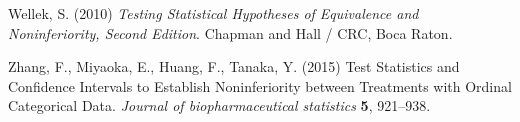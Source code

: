 \documentclass[bimj,fleqn]{w-art}
\theoremstyle{plain}
\theoremstyle{definition}
\begin{document}
\begin{thebibliography}{10}
Wellek, S. (2010) \textit{Testing Statistical Hypotheses of Equivalence and
Noninferiority, Second Edition}.
Chapman and Hall / CRC, Boca Raton.

Zhang, F., Miyaoka, E., Huang, F.,  Tanaka, Y. (2015)  Test Statistics and
Confidence Intervals to Establish Noninferiority between Treatments with Ordinal
Categorical Data. \textit{Journal of biopharmaceutical statistics} \textbf{5}, 921--938.



\end{thebibliography}
\phantom{aaaa}
\end{document}
